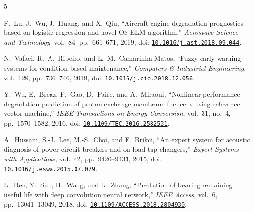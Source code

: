 \documentclass[journal]{IEEEtran}
\begin{document}
\begin{thebibliography}{5}

F.~Lu, J.~Wu, J.~Huang, and X.~Qiu, ``Aircraft engine degradation prognostics based on logistic regression and novel OS-ELM algorithm,'' \emph{Aerospace Science and Technology}, vol.~84, pp.~661--671, 2019, doi: \href{https://doi.org/10.1016/j.ast.2018.09.044}{\nolinkurl{10.1016/j.ast.2018.09.044}}.

N.~Vafaei, R.~A.~Ribeiro, and L.~M.~Camarinha-Matos, ``Fuzzy early warning systems for condition based maintenance,'' \emph{Computers \& Industrial Engineering}, vol.~128, pp.~736--746, 2019, doi: \href{https://doi.org/10.1016/j.cie.2018.12.056}{\nolinkurl{10.1016/j.cie.2018.12.056}}.

Y.~Wu, E.~Breaz, F.~Gao, D.~Paire, and A.~Miraoui, ``Nonlinear performance degradation prediction of proton exchange membrane fuel cells using relevance vector machine,'' \emph{IEEE Transactions on Energy Conversion}, vol.~31, no.~4, pp.~1570--1582, 2016, doi: \href{https://doi.org/10.1109/TEC.2016.2582531}{\nolinkurl{10.1109/TEC.2016.2582531}}.

A.~Hussain, S.-J.~Lee, M.-S.~Choi, and F.~Brikci, ``An expert system for acoustic diagnosis of power circuit breakers and on-load tap changers,'' \emph{Expert Systems with Applications}, vol.~42, pp.~9426--9433, 2015, doi: \href{https://doi.org/10.1016/j.eswa.2015.07.079}{\nolinkurl{10.1016/j.eswa.2015.07.079}}.

L.~Ren, Y.~Sun, H.~Wang, and L.~Zhang, ``Prediction of bearing remaining useful life with deep convolution neural network,'' \emph{IEEE Access}, vol.~6, pp.~13041--13049, 2018, doi: \href{https://doi.org/10.1109/ACCESS.2018.2804930}{\nolinkurl{10.1109/ACCESS.2018.2804930}}.

\end{thebibliography}
\end{document}
